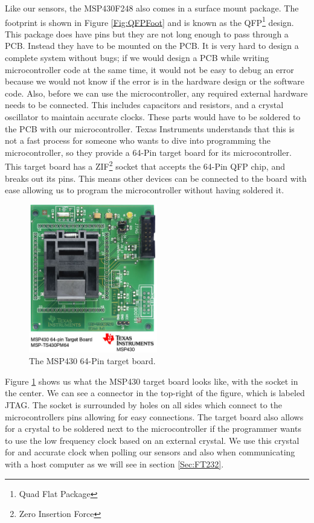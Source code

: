 Like our sensors, the MSP430F248 also comes in a surface mount package.
The footprint is shown in Figure \ref{Fig:QFPFoot}
and is known as the QFP\footnote{Quad Flat Package} design.
This package does have pins but they are not long enough to pass through a PCB.
Instead they have to be mounted on the PCB.
It is very hard to design a complete system without bugs; if we would design a PCB
while writing microcontroller code at the same time,
it would not be easy to debug an error because we would not know if the error
is in the hardware design or the software code.
Also, before we can use the microcontroller,
any required external hardware needs to be connected.
This includes capacitors and resistors,
and a crystal oscillator to maintain accurate clocks.
These parts would have to be soldered to the PCB with our microcontroller.
Texas Instruments understands that this is not a fast process for someone who wants to dive into programming the microcontroller,
so they provide a 64-Pin target board for its microcontroller. This target board has
a ZIF\footnote{Zero Insertion Force} socket that accepts the 64-Pin QFP chip,
and breaks out its pins. This means other devices can be connected to the board with ease
allowing us to program the microcontroller without having soldered it.
\begin{figure}
\begin{center}
\includegraphics[width=0.5\textwidth]{images/mspts430pm64.jpg}
\caption{The MSP430 64-Pin target board.}
\label{Fig:MSPTarget}
\end{center}
\end{figure}

Figure \ref{Fig:MSPTarget} shows us what the MSP430 target board \cite{Web:MSPTarget} looks like, with the socket in the center. We can see a connector in the top-right of the figure, which is labeled JTAG. The socket is surrounded by holes on all sides which connect to the microcontrollers pins allowing for easy connections. The target board also allows for a crystal to be soldered next to the microcontroller if the programmer wants to use the low frequency clock based on an external crystal. We use this crystal for and accurate clock when polling our sensors and also when communicating with a host computer as we will see in section \ref{Sec:FT232}.

